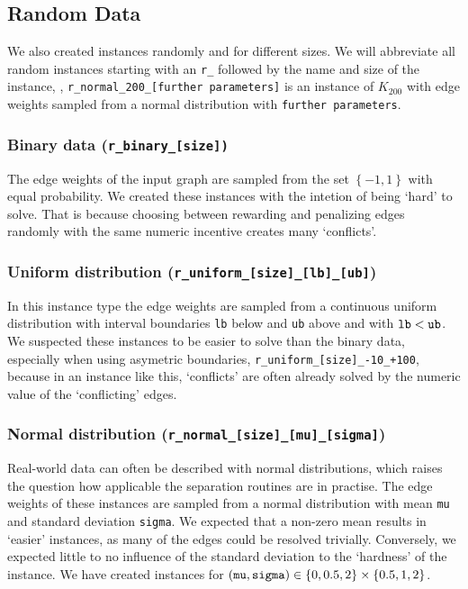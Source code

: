\subsection{Random Data}\label{subsec:random_data}
We also created \CP instances randomly and for different sizes.
We will abbreviate all random instances starting with an \texttt{r\_} followed by the name and size of the instance,
\eg, \texttt{r\_normal\_200\_[further parameters]} is an instance of $K_{200}$ with edge weights sampled from a normal distribution with \texttt{further parameters}.

\subsubsection{Binary data (\texttt{r\_binary\_[size])}}\label{subsubsec:data_random_binary}
The edge weights of the input graph are sampled from the set $\left\{ -1, 1 \right\}$ with equal probability.
We created these instances with the intetion of being ‘hard’ to solve.
That is because choosing between rewarding and penalizing edges randomly with the same numeric incentive creates many ‘conflicts’.

\subsubsection{Uniform distribution (\texttt{r\_uniform\_[size]\_[lb]\_[ub]})}\label{subsubsec:data_random_uniform}
In this instance type the edge weights are sampled from a continuous uniform distribution with interval boundaries \texttt{lb} below and \texttt{ub} above and with $\text{\texttt{lb}} < \text{\texttt{ub}}$.
We suspected these instances to be easier to solve than the binary data, especially when using asymetric boundaries, \eg \texttt{r\_uniform\_[size]\_-10\_+100}, because in an instance like this, ‘conflicts’ are often already solved by the numeric value of the ‘conflicting’ edges.

\subsubsection{Normal distribution (\texttt{r\_normal\_[size]\_[mu]\_[sigma]})}\label{subsubsec:data_random_normal}
Real-world data can often be described with normal distributions, which raises the question how applicable the separation routines are in practise.
The edge weights of these instances are sampled from a normal distribution with mean \texttt{mu} and standard deviation \texttt{sigma}.
We expected that a non-zero mean results in ‘easier’ instances, as many of the edges could be resolved trivially.
Conversely, we expected little to no influence of the standard deviation to the ‘hardness’ of the instance.
We have created instances for $(\text{\texttt{mu}}, \text{\texttt{sigma}}) \in \left\{ 0, 0.5, 2 \right\} \times \left\{ 0.5, 1, 2 \right\}$.

